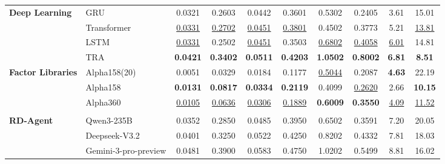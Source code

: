 \begin{table}[h]
\begin{tabular}{llcccccccc}
\midrule
\multirow{4}{*}{\textbf{Deep Learning}}
& GRU 
& 0.0321 
& 0.2603 
& 0.0442 
& 0.3601 
& 0.5302 
& 0.2405 
& 3.61 
& 15.01 \\

& Transformer 
& \underline{0.0331} 
& \underline{0.2702} 
& \underline{0.0451} 
& \underline{0.3801} 
& 0.4502 
& 0.3773
& 5.21
& \underline{13.81} \\


& LSTM 
& \underline{0.0331} 
& 0.2502 
& \underline{0.0451} 
& 0.3503 
& \underline{0.6802} 
& \underline{0.4058} 
& \underline{6.01} 
& 14.81 \\

& TRA 
& \textbf{0.0421} 
& \textbf{0.3402} 
& \textbf{0.0511} 
& \textbf{0.4203} 
& \textbf{1.0502} 
& \textbf{0.8002} 
& \textbf{6.81} 
& \textbf{8.51} \\

\midrule
\multirow{3}{*}{\textbf{Factor Libraries}}
& Alpha158(20) 
& 0.0051 
& 0.0329 
& 0.0184 
& 0.1177 
& \underline{0.5044} 
& 0.2087 
& \textbf{4.63} 
& 22.19 \\

& Alpha158 
& \textbf{0.0131} 
& \textbf{0.0817} 
& \textbf{0.0334} 
& \textbf{0.2119} 
& 0.4099 
& \underline{0.2620} 
& 2.66 
& \textbf{10.15} \\

& Alpha360 
& \underline{0.0105} 
& \underline{0.0636} 
& \underline{0.0306} 
& \underline{0.1889} 
& \textbf{0.6009} 
& \textbf{0.3550} 
& \underline{4.09} 
& \underline{11.52} \\

\midrule[0.8pt]
\rowcolor[RGB]{230, 230, 230}\multicolumn{10}{c}{\textit{\textbf{LLM-based Agentic Factor Mining}}} \\
\multirow{5}{*}{\textbf{RD-Agent}}
& Qwen3-235B 
& 0.0352 
& 0.2850 
& 0.0485 
& 0.3950 
& 0.6502 
& 0.3591 
& 7.20 
& 20.05 \\

& Deepseek-V3.2 
& 0.0401 
& 0.3250 
& 0.0522 
& 0.4250 
& 0.8202 
& 0.4332 
& 7.81 
& 18.03 \\

& Gemini-3-pro-preview 
& 0.0481 
& 0.3900 
& 0.0583 
& 0.4750 
& 1.0202 
& 0.5499 
& 8.81 
& 16.02 \\


\end{tabular}
\end{table}
